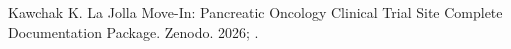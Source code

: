 
Kawchak K. La Jolla Move-In: Pancreatic Oncology Clinical Trial Site Complete
Documentation Package. Zenodo. 2026; .

\vspace{0.2em}
\mvrule{0.5pt}
\vspace{-0.1em}

\vspace{-0.35em}
\begin{mvrefs}


\end{mvrefs}
